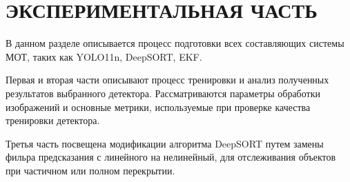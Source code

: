 \chapter{ЭКСПЕРИМЕНТАЛЬНАЯ ЧАСТЬ}

В данном разделе описывается процесс подготовки всех составляющих системы МОТ, таких как YOLO11n, DeepSORT, EKF. 

Первая и вторая части описывают процесс тренировки и анализ полученных результатов выбранного детектора. Рассматриваются параметры обработки изображений и основные метрики, используемые при проверке качества тренировки детектора.

Третья часть посвещена модификации алгоритма DeepSORT путем замены фильра предсказания с линейного на нелинейный, для отслеживания объектов при частичном или полном перекрытии.





